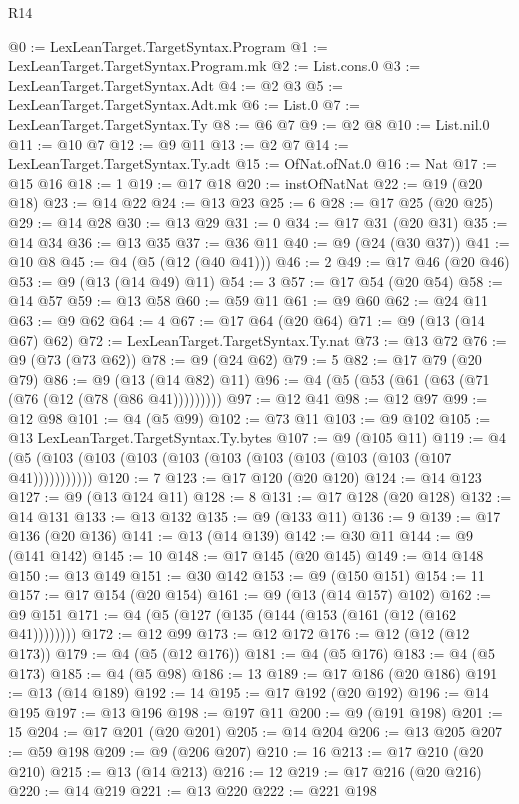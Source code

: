 \begin{lexlean}{R14}
\begin{coremodule}
@0 := LexLeanTarget.TargetSyntax.Program
@1 := LexLeanTarget.TargetSyntax.Program.mk
@2 := List.cons.{0}
@3 := LexLeanTarget.TargetSyntax.Adt
@4 := @2 @3
@5 := LexLeanTarget.TargetSyntax.Adt.mk
@6 := List.{0}
@7 := LexLeanTarget.TargetSyntax.Ty
@8 := @6 @7
@9 := @2 @8
@10 := List.nil.{0}
@11 := @10 @7
@12 := @9 @11
@13 := @2 @7
@14 := LexLeanTarget.TargetSyntax.Ty.adt
@15 := OfNat.ofNat.{0}
@16 := Nat
@17 := @15 @16
@18 := 1
@19 := @17 @18
@20 := instOfNatNat
@22 := @19 (@20 @18)
@23 := @14 @22
@24 := @13 @23
@25 := 6
@28 := @17 @25 (@20 @25)
@29 := @14 @28
@30 := @13 @29
@31 := 0
@34 := @17 @31 (@20 @31)
@35 := @14 @34
@36 := @13 @35
@37 := @36 @11
@40 := @9 (@24 (@30 @37))
@41 := @10 @8
@45 := @4 (@5 (@12 (@40 @41)))
@46 := 2
@49 := @17 @46 (@20 @46)
@53 := @9 (@13 (@14 @49) @11)
@54 := 3
@57 := @17 @54 (@20 @54)
@58 := @14 @57
@59 := @13 @58
@60 := @59 @11
@61 := @9 @60
@62 := @24 @11
@63 := @9 @62
@64 := 4
@67 := @17 @64 (@20 @64)
@71 := @9 (@13 (@14 @67) @62)
@72 := LexLeanTarget.TargetSyntax.Ty.nat
@73 := @13 @72
@76 := @9 (@73 (@73 @62))
@78 := @9 (@24 @62)
@79 := 5
@82 := @17 @79 (@20 @79)
@86 := @9 (@13 (@14 @82) @11)
@96 := @4 (@5 (@53 (@61 (@63 (@71 (@76 (@12 (@78 (@86 @41)))))))))
@97 := @12 @41
@98 := @12 @97
@99 := @12 @98
@101 := @4 (@5 @99)
@102 := @73 @11
@103 := @9 @102
@105 := @13 LexLeanTarget.TargetSyntax.Ty.bytes
@107 := @9 (@105 @11)
@119 := @4 (@5 (@103 (@103 (@103 (@103 (@103 (@103 (@103 (@103 (@103 (@107 @41)))))))))))
@120 := 7
@123 := @17 @120 (@20 @120)
@124 := @14 @123
@127 := @9 (@13 @124 @11)
@128 := 8
@131 := @17 @128 (@20 @128)
@132 := @14 @131
@133 := @13 @132
@135 := @9 (@133 @11)
@136 := 9
@139 := @17 @136 (@20 @136)
@141 := @13 (@14 @139)
@142 := @30 @11
@144 := @9 (@141 @142)
@145 := 10
@148 := @17 @145 (@20 @145)
@149 := @14 @148
@150 := @13 @149
@151 := @30 @142
@153 := @9 (@150 @151)
@154 := 11
@157 := @17 @154 (@20 @154)
@161 := @9 (@13 (@14 @157) @102)
@162 := @9 @151
@171 := @4 (@5 (@127 (@135 (@144 (@153 (@161 (@12 (@162 @41))))))))
@172 := @12 @99
@173 := @12 @172
@176 := @12 (@12 (@12 @173))
@179 := @4 (@5 (@12 @176))
@181 := @4 (@5 @176)
@183 := @4 (@5 @173)
@185 := @4 (@5 @98)
@186 := 13
@189 := @17 @186 (@20 @186)
@191 := @13 (@14 @189)
@192 := 14
@195 := @17 @192 (@20 @192)
@196 := @14 @195
@197 := @13 @196
@198 := @197 @11
@200 := @9 (@191 @198)
@201 := 15
@204 := @17 @201 (@20 @201)
@205 := @14 @204
@206 := @13 @205
@207 := @59 @198
@209 := @9 (@206 @207)
@210 := 16
@213 := @17 @210 (@20 @210)
@215 := @13 (@14 @213)
@216 := 12
@219 := @17 @216 (@20 @216)
@220 := @14 @219
@221 := @13 @220
@222 := @221 @198

\end{coremodule}
\end{lexlean}
